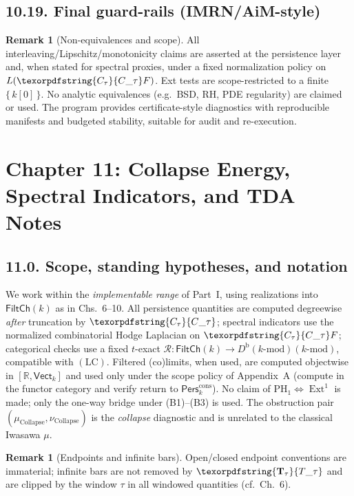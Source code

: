 \documentclass[11pt]{article}
\numberwithin{equation}{section}
\theoremstyle{plain}
\theoremstyle{definition}
\theoremstyle{remark}
\DeclareMathOperator{\Ext}{Ext}
\DeclareRobustCommand{\hyp}{\nobreakdash-}
\newcommand{\Pers}{\mathsf{Pers}}
\newcommand{\Rfun}{\mathcal{R}}
\theoremstyle{plain}
\theoremstyle{definition}
\numberwithin{equation}{section}
\theoremstyle{definition}
\newtheorem{remark}[theorem]{Remark}
\DeclareRobustCommand{\FiltCh}[1]{\mathsf{FiltCh}(#1)}
\DeclareRobustCommand{\Ttau}{\texorpdfstring{\ensuremath{\mathbf{T}_{\tau}}}{T\_\tau}}
\DeclareRobustCommand{\Ctau}{\texorpdfstring{\ensuremath{C_{\tau}}}{C\_\tau}}
\DeclareRobustCommand{\Db}{D^{\mathrm{b}}(k\text{-mod})}
\DeclareRobustCommand{\muc}{\mu_{\mathrm{Collapse}}}
\DeclareRobustCommand{\nuc}{\nu_{\mathrm{Collapse}}}
\DeclareRobustCommand{\LC}{\texorpdfstring{\ensuremath{\mathrm{(LC)}}}{(LC)}}
\DeclareRobustCommand{\Qtest}{\{\,k[0]\,\}}
\numberwithin{equation}{section}
\theoremstyle{plain}
\theoremstyle{definition}
\theoremstyle{remark}
\providecommand{\Cfun}[1]{\mathsf{C}_{#1}}
\providecommand{\Tfun}[1]{\mathbf{T}_{#1}}
\providecommand{\Ctau}{\Cfun{\tau}}
\providecommand{\Ttau}{\Tfun{\tau}}
\providecommand{\muc}{\mu_{\mathrm{Collapse}}}
\providecommand{\nuc}{\nu_{\mathrm{Collapse}}}
\begin{document}
\subsection*{10.19. Final guard\hyp rails (IMRN/AiM\hyp style)}
\begin{remark}[Non\hyp equivalences and scope]
All interleaving/Lipschitz/monotonicity claims are asserted at the persistence layer and, when stated for spectral proxies, under a fixed normalization policy on \(L(\Ctau F)\). Ext tests are scope\hyp restricted to a finite \(\Qtest\).
No analytic equivalences (e.g.\ BSD, RH, PDE regularity) are claimed or used. The program provides certificate\hyp style diagnostics with reproducible manifests and budgeted stability, suitable for audit and re\hyp execution.
\end{remark}



\section{Chapter 11: Collapse Energy, Spectral Indicators, and TDA Notes}

\subsection*{11.0. Scope, standing hypotheses, and notation}
We work within the \emph{implementable range} of Part~I, using realizations into $\FiltCh{k}$ as in Chs.~6–10. All persistence quantities are computed degreewise \emph{after} truncation by $\Ctau$; spectral indicators use the normalized combinatorial Hodge Laplacian on $\Ctau F$; categorical checks use a fixed $t$-exact $\Rfun:\FiltCh{k}\to\Db(k\text{-mod})$, compatible with \LC. Filtered (co)limits, when used, are computed objectwise in $[\mathbb{R},\mathsf{Vect}_k]$ and used only under the scope policy of Appendix~A (compute in the functor category and verify return to $\Pers^{\mathrm{cons}}_k$). No claim of $\mathrm{PH}_1\Leftrightarrow \Ext^1$ is made; only the one-way bridge under (B1)–(B3) is used. The obstruction pair $(\muc,\nuc)$ is the \emph{collapse} diagnostic and is unrelated to the classical Iwasawa $\mu$.

\begin{remark}[Endpoints and infinite bars]\label{rk:11-endpoints}
Open/closed endpoint conventions are immaterial; infinite bars are not removed by $\Ttau$ and are clipped by the window $\tau$ in all windowed quantities (cf.\ Ch.~6).
\end{remark}
\end{document}
